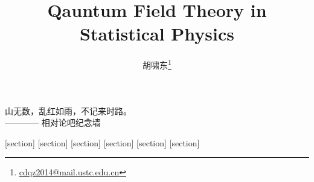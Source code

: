 \documentclass[b5paper,10pt,UTF8]{book}
\title{\zihao{0}\textbf{Qauntum Field Theory in Statistical Physics}}
\author{{\kaishu 胡啸东}\thanks{\url{cdqz2014@mail.ustc.edu.cn}}}
\newenvironment{dedication}
{
   \cleardoublepage
   \thispagestyle{empty}
   \vspace*{\stretch{1}}
   \hfill\begin{minipage}[t]{0.66\textwidth}
   \raggedright
}
{
   \end{minipage}
   \vspace*{\stretch{3}}
   \clearpage
}
\numberwithin{equation}{section}
\begin{document}
\frontmatter
\maketitle

\begin{dedication}
	{\kaishu 山无数，乱红如雨，不记来时路。}\\
	\hfill{———— 相对论吧纪念墙\quad}
\end{dedication}

\mainmatter

[section]
\newenvironment{Experiment}[1][]{{\par\normalfont\bfseries 实验事实~\stepcounter{Experiment}\arabic{Experiment}#1~~}\kaishu}{\par}
[section]
\newenvironment{Axiom}[1][]{{\par\normalfont\bfseries 公理~\stepcounter{Axiom}\arabic{Axiom}#1~~}\kaishu}{\par}
[section]
\newenvironment{Hypothesis}[1][]{{\par\normalfont\bfseries 假设~\stepcounter{Hypothesis}\arabic{Hypothesis}#1~~}\kaishu}{\par}
\newenvironment{Hypothesis*}[1][]{{\par\normalfont\bfseries 假设~#1~~}\kaishu}{\par}
[section]
\newenvironment{Proposition}[1][]{{\par\normalfont\bfseries 命题~\stepcounter{Proposition}\arabic{Proposition}#1~~}\kaishu}{\par}
[section]
\newenvironment{Corollary}[1][]{{\par\normalfont\bfseries 推论~\stepcounter{Corollary}\arabic{Corollary}#1~~}\kaishu}{\par}
[section]
\newenvironment{Theorem}[1][]{{\par\normalfont\bfseries 定理~\stepcounter{Theorem}\arabic{Theorem}#1~~}\kaishu}{\par}
\end{document}

